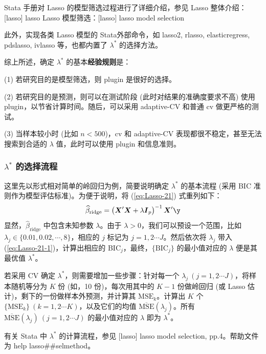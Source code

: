 Stata 手册对 Lasso 的模型筛选过程进行了详细介绍，参见 
Lasso 整体介绍：[lasso] lasso
Lasso 模型筛选：[lasso] lasso model selection

此外，实现各类 Lasso 模型的 Stata外部命令，如 lasso2, rlasso, elasticregress, pdslasso, ivlasso 等，也都内置了 $\lambda^*$ 的选择方法。 


综上所述，确定 $\lambda^{*}$ 的基本\textbf{经验规则}是：


(1) 若研究目的是模型筛选，则 plugin 是很好的选择。

(2) 若研究目的是预测，则可以在测试阶段 (此时对结果的准确度要求不高) 使用 plugin，以节省计算时间。随后，可以采用 adaptive-CV 和普通 cv 做更严格的测试。

(3) 当样本较小时 (比如 $n<500$)，cv 和 adaptive-CV 表现都很不稳定，甚至无法搜索到合适的 $\lambda$ 值，此时可以使用 plugin 和信息准则。

\subsubsection{$\lambda^*$ 的选择流程}

这里先以形式相对简单的岭回归为例，简要说明确定  $\lambda^*$ 的基本流程 (采用 BIC 准则作为模型评估标准)。为便于说明，将
(\ref{eq:Lasso-21}) 式重列如下：
\begin{equation}\label{eq:Lasso-21-1}
	\widehat{\beta}_{\text {ridge}} =\left(\boldsymbol{X}^{\prime} \boldsymbol{X}+\lambda \boldsymbol{I}_{p}\right)^{-1} \boldsymbol{X}^{\prime} \boldsymbol{\y}
\end{equation}
显然，$\widehat{\beta}_{\text {ridge}}$ 中包含未知参数 $\lambda$。由于 $\lambda>0$，我们可以预设一个范围，比如 $\lambda_j \in \{0.01, 0.02, \cdots, 8\}$，相应的 $j$ 标记为 $j=1,2\cdots J$。然后依次将 $\lambda_j$ 带入 (\ref{eq:Lasso-21-1})，计算出相应的 BIC$_j$，最终，$\{\mathrm{BIC}_j\}$ 的最小值对应的 $\lambda$ 便是其最优值 $\lambda^*$。

若采用 CV 确定 $\lambda^*$，则需要增加一些步骤：针对每一个 $\lambda_j\ (j=1,2\cdots J)$，将样本随机等分为 $K$ 份 (如，10 份)，每次用其中的 $K-1$ 份做岭回归 (或 Lasso 估计)，剩下的一份做样本外预测，并计算其 $\mathrm{MSE}_k$。计算出 $K$ 个 $\{\mathrm{MSE}_k\}\ (k=1,2\cdots K)$，以及它们的均值 $\overline{\mathrm{MSE}}(\lambda_j)$。所有 $\overline{\mathrm{MSE}}(\lambda_j)\ (j=1,2\cdots J)$ 的最小值对应的 $\lambda$ 即为 $\lambda^*$。

有关 Stata 中 $\lambda^*$ 的计算流程，参见 [lasso] lasso model selection, pp.4。帮助文件为 help lasso\#\#selmethod。

